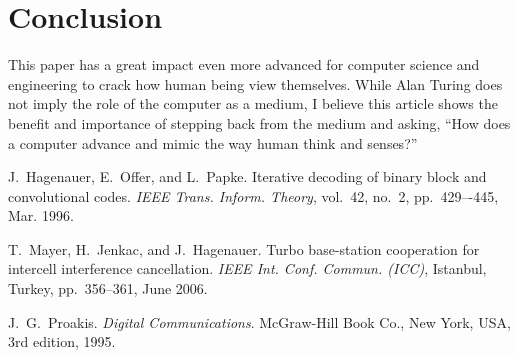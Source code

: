 \documentclass[journal, a4paper]{IEEEtran}
\begin{document}
\section{Conclusion}
	This paper has a great impact even more advanced for computer science and engineering to crack how human being view themselves. While Alan Turing does not imply the role of the computer as a medium, I believe this article shows the benefit and importance of stepping back from the medium and asking, “How does a computer advance and mimic the way human think and senses?”


\begin{thebibliography}{5}

	J.~Hagenauer, E.~Offer, and L.~Papke. Iterative decoding of binary block
	and convolutional codes. {\em IEEE Trans. Inform. Theory},
	vol.~42, no.~2, pp.~429–-445, Mar. 1996.

	T.~Mayer, H.~Jenkac, and J.~Hagenauer. Turbo base-station cooperation for intercell interference cancellation. {\em IEEE Int. Conf. Commun. (ICC)}, Istanbul, Turkey, pp.~356--361, June 2006.

	J.~G.~Proakis. {\em Digital Communications}. McGraw-Hill Book Co.,
	New York, USA, 3rd edition, 1995.

\end{thebibliography}
\end{document}
